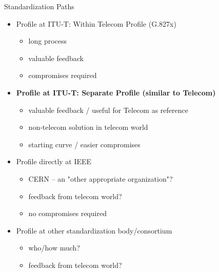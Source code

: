 \documentclass[compress,red]{beamer}
\begin{document}
\begin{frame}{Standardization Paths}

    \begin{itemize}
	\item Profile at ITU-T: Within Telecom Profile (G.827x)
	  \begin{itemize}
	    \item long process
	    \item valuable feedback
	    \item compromises required
	  \end{itemize}
	  \item {\bf Profile at ITU-T: Separate Profile (similar to Telecom)}
	  \begin{itemize}
	    \item valuable feedback / useful for Telecom as reference
	    \item non-telecom solution in telecom world
	    \item starting curve / easier compromises
	  \end{itemize}
	\item Profile directly at IEEE
	  \begin{itemize}
	    \item CERN -- an "other appropriate organization"?
	    \item feedback from telecom world?
	    \item no compromises required
	  \end{itemize}
	\item Profile at other standardization body/consortium
	  \begin{itemize}
	    \item who/how much?
	    \item feedback from telecom world?
	  \end{itemize}
    \end{itemize}


\end{frame}
\end{document}
